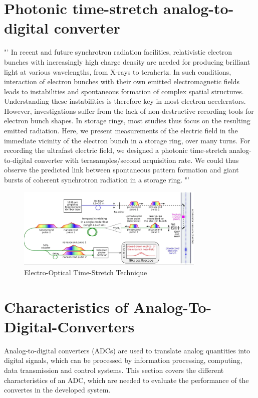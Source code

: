\newpage 
\section{Photonic time-stretch analog-to-digital converter}










"' In recent and future synchrotron radiation facilities, relativistic electron bunches with increasingly high charge density are needed for producing brilliant light at various wavelengths, from X-rays to terahertz. In such conditions, interaction of electron bunches with their own emitted electromagnetic fields leads to instabilities and spontaneous formation of complex spatial structures. Understanding these instabilities is therefore key in most electron accelerators. However, investigations suffer from the lack of non-destructive recording tools for electron bunch shapes. In storage rings, most studies thus focus on the resulting emitted radiation. Here, we present measurements of the electric field in the immediate vicinity of the electron bunch in a storage ring, over many turns. For recording the ultrafast electric field, we designed a photonic time-stretch analog-to-digital converter with terasamples/second acquisition rate. We could thus observe the predicted link between spontaneous pattern formation and giant bursts of coherent synchrotron radiation in a storage ring. "'  \cite{Bielawski2019}

\begin{figure}[H]
	\centering
	\includegraphics[width = 0.8\textwidth]{chap/02-theory/img/EO.png}
	\caption{Electro-Optical Time-Stretch Technique \cite{Bielawski2019}}
	\label{fig:eo}
\end{figure}


\newpage
\section{Characteristics of Analog-To-Digital-Converters}
Analog-to-digital converters (ADCs) are used to translate analog quantities into digital signals, which can be processed by information processing, computing, data transmission and control systems. This section covers the different characteristics of an ADC, which are needed to evaluate the performance of the convertes in the developed system. 
